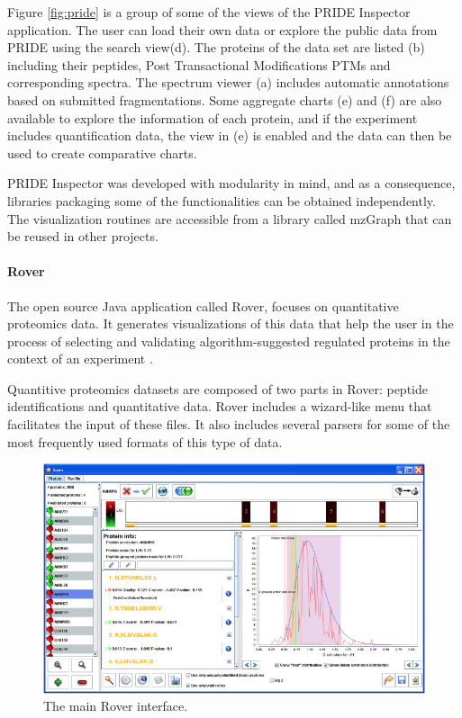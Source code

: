 Figure \ref{fig:pride} is a group of some of the views of the PRIDE Inspector application. The user can load their own data or explore the public data from PRIDE using the search view(d). The proteins of the data set are listed (b) including their peptides, Post Transactional Modifications PTMs and corresponding spectra. The spectrum viewer (a) includes automatic annotations based on submitted fragmentations. Some aggregate charts (e) and (f) are also available to explore the information of each protein, and if the experiment includes quantification data, the view in (e) is enabled and the data can then be used to create comparative charts.

PRIDE Inspector was developed with modularity in mind, and as a consequence, libraries packaging some of the functionalities can be obtained independently. The visualization routines are accessible from a library called mzGraph that can be reused in other projects.

\paragraph{Rover}
The open source Java application called Rover, focuses on quantitative proteomics data. It generates visualizations of this data that help the user in the process of selecting and validating algorithm-suggested regulated proteins in the context of an experiment \cite{PER2014}.

Quantitive proteomics datasets are composed of two parts in Rover: peptide identifications and quantitative data. Rover includes a wizard-like menu that facilitates the input of these files. It also includes several parsers for some of the most frequently used formats of this type of data.

\begin{figure}  
\centering
\includegraphics[width=\textwidth]{figures/rover.png}
\caption[The main Rover interface.]{The main Rover interface.
\label{fig:rover}}
\end{figure}


